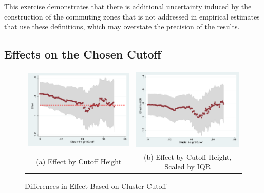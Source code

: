 This exercise demonstrates that there is additional uncertainty induced by the construction of the commuting zones that is not addressed in empirical estimates that use these definitions, which may overstate the precision of the results.


\subsection{Effects on the Chosen Cutoff}

\begin{figure}\centering
\caption{Differences in Effect Based on Cluster Cutoff \label{fig:cutoff_dist}}
\begin{tabular}{cc}

\includegraphics[scale=.4]{./figures/cutoff_1990.png} & 
\includegraphics[scale=.4]{./figures/cutoff_iqr_1990.png}\\
(a) Effect by Cutoff Height & (b) Effect by Cutoff Height, Scaled by IQR \\


\end{tabular}
\end{figure}

